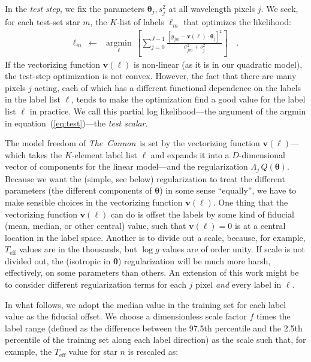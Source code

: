 \documentclass[12pt,preprint]{aastex}
\newcommand{\project}[1]{\textsl{#1}}
\newcommand{\TheCannon}{\project{The~Cannon}}
\newcommand{\logg}{\log g}
\newcommand{\Teff}{T_{\mathrm{eff}}}
\newcommand{\Dvector}[1]{\boldsymbol{#1}}
\newcommand{\vectheta}{\Dvector{\theta}}
\newcommand{\vecv}{\Dvector{v}}
\newcommand{\argmin}[1]{\underset{#1}{\operatorname{argmin}}\,}
\begin{document}
In the \emph{test step}, we fix the parameters $\vectheta_j,s^2_j$ at all
wavelength pixels $j$.  We seek, for each test-set star $m$, the $K$-list of 
labels $\ell_m$ that optimizes the likelihood:
\begin{eqnarray}\label{eq:test}
  \ell_m &\leftarrow& \argmin{\ell}\left[
    \sum_{j=0}^{J-1} \frac{[y_{jm}-\vecv(\ell)\cdot\vectheta_j]^2}{\sigma^2_{jm}+s^2_j}
    \right]
  \quad .
\end{eqnarray}
If the vectorizing function $\vecv(\ell)$ is non-linear (as it is in our 
quadratic model), the test-step optimization is not convex.  However, the fact
that there are many pixels $j$ acting, each of which has a different functional
dependence on the labels in the label list $\ell$, tends to make the 
optimization find a good value for the label list $\ell$ in practice.  We call
this partial log likelihood---the argument of the argmin in 
equation~(\ref{eq:test})---the \emph{test scalar}.


The model freedom of \TheCannon\ is set by the vectorizing function 
$\vecv(\ell)$---which takes the $K$-element label list $\ell$ and expands it 
into a $D$-dimensional vector of components for the linear model---and the 
regularization $\Lambda_j\,Q(\vectheta)$.  Because we want the (simple, see 
below) regularization to treat the different parameters (the different 
components of $\vectheta$) in some sense ``equally'', we have to make sensible 
choices in the vectorizing function $\vecv(\ell)$.  One thing that the 
vectorizing function $\vecv(\ell)$ can do is offset the labels by some kind of
fiducial (mean, median, or other central) value, such that $\vecv(\ell)=0$ is at
a central location in the label space.  Another is to divide out a scale, 
because, for example, $\Teff$ values are in the thousands, but $\logg$ values
are of order unity.  If scale is not divided out, the (isotropic in $\vectheta$)
regularization will be much more harsh, effectively, on some parameters than 
others.  An extension of this work might be to consider different regularization
terms for each $j$ pixel \emph{and} every label in $\ell$.


In what follows, we adopt the median value in the training set for each label 
value as the fiducial offset.  We choose a dimensionless scale factor $f$ 
times the label range (defined as the difference between the 97.5th percentile
and the 2.5th percentile of the training set along each label direction) as 
the scale such that, for example, the $\Teff$ value for star $n$ is rescaled as:
\end{document}
